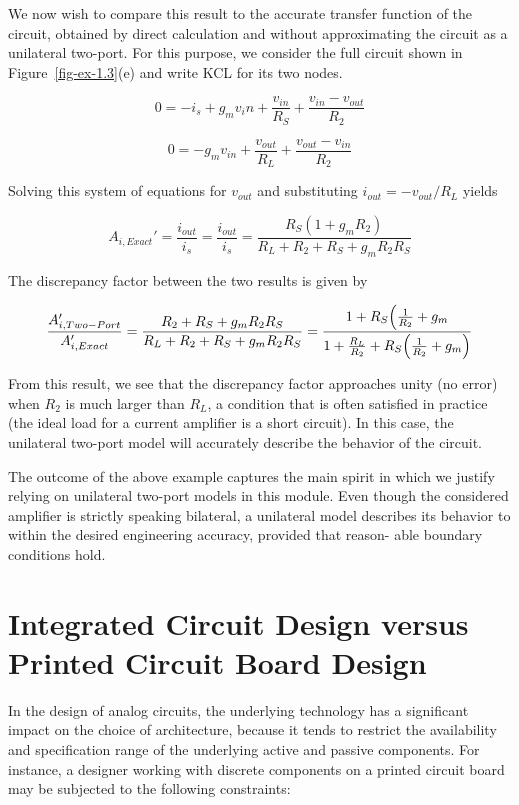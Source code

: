 \documentclass[
  11pt,
  letterpaper,
  abstract]{scrbook}
\begin{document}
We now wish to compare this result to the accurate transfer function of
the circuit, obtained by direct calculation and without approximating
the circuit as a unilateral two-port. For this purpose, we consider the
full circuit shown in Figure~\ref{fig-ex-1.3}(e) and write KCL for its
two nodes.

\[
0 = - i_s + g_m v_in + \frac{v_{in}}{R_S} + \frac{v_{in} - v_{out}}{R_2}
\]

\[
0 = -g_m v_{in} + \frac{v_{out}}{R_L} + \frac{v_{out} - v_{in}}{R_2}
\]

Solving this system of equations for \(v_{out}\) and substituting
\(i_{out} = - v_{out} / R_L\) yields

\[
A_{i, Exact}' = \frac{i_{out}}{i_s} = \frac{i_{out}}{i_s} = 
\frac{R_S (1 + g_m R_2)}{R_L + R_2 + R_S + g_m R_2 R_S}
\]

The discrepancy factor between the two results is given by

\[
\frac{A_{i, Two-Port}'}{A_{i, Exact}'} = \frac{R_2 + R_S + g_m R_2 R_S}{R_L + R_2 + R_S + g_m R_2 R_S} = \frac{1 + R_S \Bigl(\frac{1}{R_2} + g_m}{1 + \frac{R_L}{R_2} + R_S \Bigl(\frac{1}{R_2} + g_m \Bigr)}
\]

From this result, we see that the discrepancy factor approaches unity
(no error) when \(R_2\) is much larger than \(R_L\), a condition that is
often satisfied in practice (the ideal load for a current amplifier is a
short circuit). In this case, the unilateral two-port model will
accurately describe the behavior of the circuit.

The outcome of the above example captures the main spirit in which we
justify relying on unilateral two-port models in this module. Even
though the considered amplifier is strictly speaking bilateral, a
unilateral model describes its behavior to within the desired
engineering accuracy, provided that reason- able boundary conditions
hold.

\section{Integrated Circuit Design versus Printed Circuit Board
Design}\label{integrated-circuit-design-versus-printed-circuit-board-design}

In the design of analog circuits, the underlying technology has a
significant impact on the choice of architecture, because it tends to
restrict the availability and specification range of the underlying
active and passive components. For instance, a designer working with
discrete components on a printed circuit board may be subjected to the
following constraints:
\end{document}
